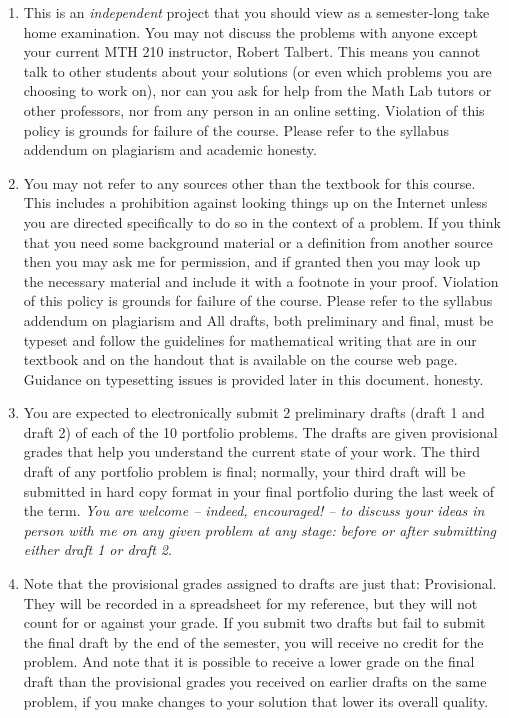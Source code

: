 \documentclass[11pt]{article}
\begin{document}
\begin{enumerate}[itemsep=0pt]
	\item This is an \emph{independent} project that you should view as a semester-long take home examination.  You may not discuss the problems with anyone except your current MTH 210 instructor, Robert Talbert.  This means you cannot talk to other students about
	your solutions (or even which problems you are choosing to work on), nor can you ask for help from the Math Lab tutors
	or other professors, nor from any person in an online setting.  Violation of this policy is grounds for failure of the course.  Please refer to the syllabus addendum on plagiarism and academic honesty.
	\item You may not refer to any sources other than the textbook for this course.  This includes a prohibition against looking things up on the Internet unless you are directed specifically to do so in the context of a problem.  If you think that you need some background material or a definition from another source then you may ask me for permission, and if granted then you may look up the necessary material and include it with a footnote in your proof. Violation of this policy is grounds for failure of the course.  Please refer to the syllabus addendum on plagiarism and All drafts, both preliminary and final, must be typeset and follow the  guidelines for mathematical writing that are in our textbook and on the handout that is available on the course web page.  Guidance on typesetting issues is provided later in this document. honesty.
	\item You are expected to electronically submit  2 preliminary drafts (draft 1 and draft 2) of each of the 10 portfolio problems.  The drafts are given provisional grades that help you understand the current state of your work.  The third draft of any portfolio problem is final; normally, your third draft will be submitted in hard copy format in your final portfolio during the last week of the term.
	\emph{You are welcome -- indeed, encouraged! -- to discuss your ideas in person with me on any given problem at any stage:  before or after submitting either draft 1 or draft 2}.
	\item Note that the provisional grades assigned to drafts are just that: Provisional. They will be recorded in a spreadsheet for my reference, but they will not count for or against your grade. If you submit two drafts but fail to submit the final draft by the end of the semester, you will receive no credit for the problem. And note that it is possible to receive a lower grade on the final draft than the provisional grades you received on earlier drafts on the same problem, if you make changes to your solution that lower its overall quality. 
	

\end{enumerate}
\end{document}
